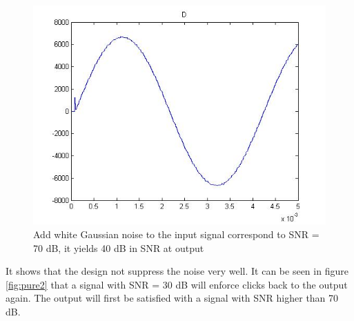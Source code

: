 \begin{figure}[h]
 \centering
 \includegraphics[scale=0.35]{images/noise40.jpg}
 \caption{Add white Gaussian noise to the input signal correspond to SNR = 70 dB, it yields 40 dB in SNR at output }
 \label{fig:pure3}
\end{figure}


It shows that the design not suppress the noise very well. It can be seen in figure \ref{fig:pure2} that a signal with SNR = 30 dB will enforce clicks back to the output again. The output will first be satisfied with a signal with SNR higher than 70 dB.
